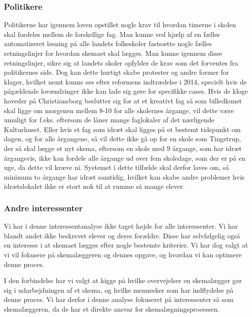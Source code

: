 \subsubsection{Politikere}
Politikerne har igennem loven opstillet nogle krav til hvordan timerne i skolen skal fordeles mellem de forskellige fag. Man kunne ved hjælp af en fælles automatiseret løsning på alle landets folkeskoler fastsætte nogle fælles retningslinjer for hvordan skemaet skal lægges. Man kunne igennem disse retningslinjer, sikre sig at landets skoler opfylder de krav som det forventes fra politikernes side. Dog kan dette hurtigt skabe protester og andre former for klager, hvilket nemt kunne ses efter reformens indtrædelse i 2014\cite{LaererBrok}, specielt hvis de pågældende lovændringer ikke kan lade sig gøre for specifikke cases. Hvis de kloge hoveder på Christiansborg beslutter sig for at et kreativt fag så som billedkunst skal ligge om morgenen mellem 8-10 for alle skolernes årgange, vil dette være umuligt for f.eks. \school eftersom de låner mange faglokaler af det nærligende Kulturhuset\cite{interview_Kaerby}. Eller hvis et fag som idræt skal ligges på et bestemt tidspunkt om dagen, og for alle årgangene, så vil dette ikke gå op for en skole som Tingstrup\cite{interview_Tingstrup}, der så skal lægge et nyt skema, eftersom en skole med 9 årgange, som har idræt årgangsvis, ikke kan fordele alle årgange ud over fem skoledage, som der er på en uge, da dette vil kræve ni. Systemet i dette tilfælde skal derfor laves om, så minimum to årgange har idræt samtidig, hvilket kan skabe andre problemer hvis idrætslokalet ikke er stort nok til at rumme så mange elever.

\subsubsection{Andre interessenter}
Vi har i denne interessentanalyse ikke taget højde for alle interessenter. Vi har blandt andet ikke beskrevet elever og deres forældre. Disse har selvfølgelig også en interesse i at skemaet lægges efter nogle bestemte kriterier. Vi har dog valgt at vi vil fokusere på skemalæggeren og dennes opgave, og hvordan vi kan optimere denne proces.

I den forbindelse har vi valgt at kigge på hvilke overvejelser en skemalægger gør sig i udarbejdningen af et skema, og hvilke mennesker som har indflydelse på denne proces. Vi har derfor i denne analyse fokuseret på interessenter så som skemalæggeren, da de har et direkte ansvar for skemalægningsprocessen.


